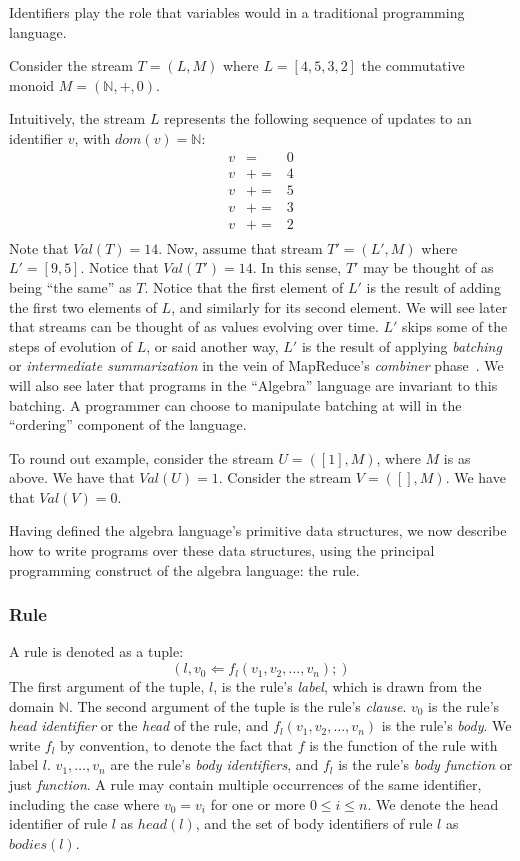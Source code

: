 Identifiers play the role that variables would in a traditional programming language.

\begin{example}
Consider the stream $T = (L,M)$ where $L = [4, 5, 3, 2]$ the commutative monoid $M = (\mathbb{N}, +, 0)$.

Intuitively, the stream $L$ represents the following sequence of updates to an identifier $v$, with $dom(v) = \mathbb{N}$:
\begin{eqnarray*}
v &=& 0\\
v &+=& 4\\
v &+=& 5\\
v &+=& 3\\
v &+=& 2\\
\end{eqnarray*}
Note that $Val(T) = 14$.  Now, assume that stream $T' = (L',M)$ where $L' = [9, 5]$.  Notice that $Val(T') = 14$.  In this sense, $T'$ may be thought of as being ``the same'' as $T$.  Notice that the first element of $L'$ is the result of adding the first two elements of $L$, and similarly for its second element.  We will see later that streams can be thought of as values evolving over time.  $L'$ skips some of the steps of evolution of $L$, or said another way, $L'$ is the result of applying {\em batching} or {\em intermediate summarization} in the vein of MapReduce's {\em combiner} phase~\cite{Dean2004}.  We will also see later that programs in the ``Algebra'' language are invariant to this batching.  A programmer can choose to manipulate batching at will in the ``ordering'' component of the language.

To round out example, consider the stream $U = ([1], M)$, where $M$ is as above.  We have that $Val(U) = 1$.  Consider the stream $V = ([], M)$.  We have that $Val(V) = 0$.
\end{example}

Having defined the algebra language's primitive data structures, we now describe how to write programs over these data structures, using the principal programming construct of the algebra language: the rule.

\subsubsection{Rule}

A rule is denoted as a tuple: $$(l, v_0 \Leftarrow f_l(v_1, v_2, \dots, v_n);)$$  The first argument of the tuple, $l$, is the rule's {\em label}, which is drawn from the domain $\mathbb{N}$.  The second argument of the tuple is the rule's {\em clause}. $v_0$ is the rule's {\em head identifier} or the {\em head} of the rule, and $f_l(v_1, v_2, \dots, v_n)$ is the rule's {\em body}.  We write $f_l$ by convention, to denote the fact that $f$ is the function of the rule with label $l$.  $v_1, \dots, v_n$ are the rule's {\em body identifiers}, and $f_l$ is the rule's {\em body function} or just {\em function}.  A rule may contain multiple occurrences of the same identifier, including the case where $v_0 = v_i$ for one or more $0 \leq i \leq n$.  We denote the head identifier of rule $l$ as $head(l)$, and the set of body identifiers of rule $l$ as $bodies(l)$.

